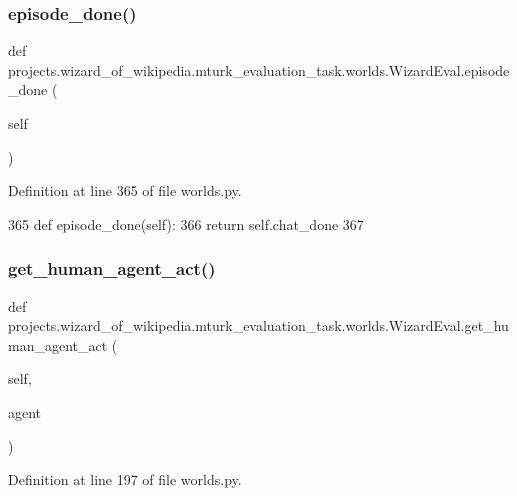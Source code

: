 \subsubsection{\texorpdfstring{episode\+\_\+done()}{episode\_done()}}
{\footnotesize\ttfamily def projects.\+wizard\+\_\+of\+\_\+wikipedia.\+mturk\+\_\+evaluation\+\_\+task.\+worlds.\+Wizard\+Eval.\+episode\+\_\+done (\begin{DoxyParamCaption}\item[{}]{self }\end{DoxyParamCaption})}



Definition at line 365 of file worlds.\+py.


\begin{DoxyCode}
365     \textcolor{keyword}{def }episode\_done(self):
366         \textcolor{keywordflow}{return} self.chat\_done
367 
\end{DoxyCode}
\mbox{\label{classprojects_1_1wizard__of__wikipedia_1_1mturk__evaluation__task_1_1worlds_1_1WizardEval_abc7bd5ac461df6eaf0e591888aaf68b9}} 
\subsubsection{\texorpdfstring{get\+\_\+human\+\_\+agent\+\_\+act()}{get\_human\_agent\_act()}}
{\footnotesize\ttfamily def projects.\+wizard\+\_\+of\+\_\+wikipedia.\+mturk\+\_\+evaluation\+\_\+task.\+worlds.\+Wizard\+Eval.\+get\+\_\+human\+\_\+agent\+\_\+act (\begin{DoxyParamCaption}\item[{}]{self,  }\item[{}]{agent }\end{DoxyParamCaption})}



Definition at line 197 of file worlds.\+py.


